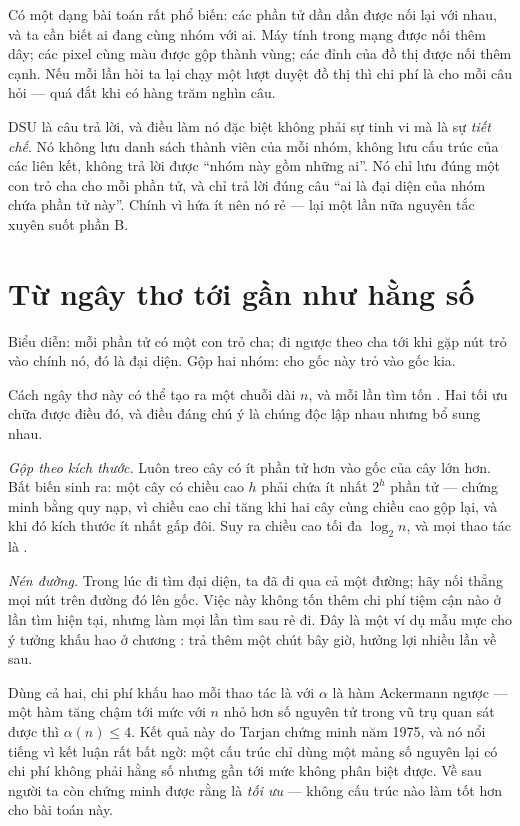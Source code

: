 \documentclass[../../algorithm.tex]{subfiles}
\begin{document}
Có một dạng bài toán rất phổ biến: các phần tử dần dần được nối lại với nhau, và ta cần biết ai đang cùng nhóm với ai. Máy tính trong mạng được nối thêm dây; các pixel cùng màu được gộp thành vùng; các đỉnh của đồ thị được nối thêm cạnh. Nếu mỗi lần hỏi ta lại chạy một lượt duyệt đồ thị thì chi phí là  cho mỗi câu hỏi --- quá đắt khi có hàng trăm nghìn câu.

DSU là câu trả lời, và điều làm nó đặc biệt không phải sự tinh vi mà là sự \emph{tiết chế}. Nó không lưu danh sách thành viên của mỗi nhóm, không lưu cấu trúc của các liên kết, không trả lời được ``nhóm này gồm những ai''. Nó chỉ lưu đúng một con trỏ cha cho mỗi phần tử, và chỉ trả lời đúng câu ``ai là đại diện của nhóm chứa phần tử này''. Chính vì hứa ít nên nó rẻ --- lại một lần nữa nguyên tắc xuyên suốt phần B.

\section{Từ ngây thơ tới gần như hằng số}

Biểu diễn: mỗi phần tử có một con trỏ cha; đi ngược theo cha tới khi gặp nút trỏ vào chính nó, đó là đại diện. Gộp hai nhóm: cho gốc này trỏ vào gốc kia.

Cách ngây thơ này có thể tạo ra một chuỗi dài \(n\), và mỗi lần tìm tốn . Hai tối ưu chữa được điều đó, và điều đáng chú ý là chúng độc lập nhau nhưng bổ sung nhau.

\emph{Gộp theo kích thước.} Luôn treo cây có ít phần tử hơn vào gốc của cây lớn hơn. Bất biến sinh ra: một cây có chiều cao \(h\) phải chứa ít nhất \(2^h\) phần tử --- chứng minh bằng quy nạp, vì chiều cao chỉ tăng khi hai cây cùng chiều cao gộp lại, và khi đó kích thước ít nhất gấp đôi. Suy ra chiều cao tối đa \(\log_2 n\), và mọi thao tác là .

\emph{Nén đường.} Trong lúc đi tìm đại diện, ta đã đi qua cả một đường; hãy nối thẳng mọi nút trên đường đó lên gốc. Việc này không tốn thêm chi phí tiệm cận nào ở lần tìm hiện tại, nhưng làm mọi lần tìm sau rẻ đi. Đây là một ví dụ mẫu mực cho ý tưởng khấu hao ở chương : trả thêm một chút bây giờ, hưởng lợi nhiều lần về sau.

Dùng cả hai, chi phí khấu hao mỗi thao tác là  với \(\alpha\) là hàm Ackermann ngược --- một hàm tăng chậm tới mức với \(n\) nhỏ hơn số nguyên tử trong vũ trụ quan sát được thì \(\alpha(n) \le 4\). Kết quả này do Tarjan chứng minh năm 1975\cite{tarjan1975}, và nó nổi tiếng vì kết luận rất bất ngờ: một cấu trúc chỉ dùng một mảng số nguyên lại có chi phí không phải hằng số nhưng gần tới mức không phân biệt được. Về sau người ta còn chứng minh được rằng  là \emph{tối ưu} --- không cấu trúc nào làm tốt hơn cho bài toán này.
\end{document}
